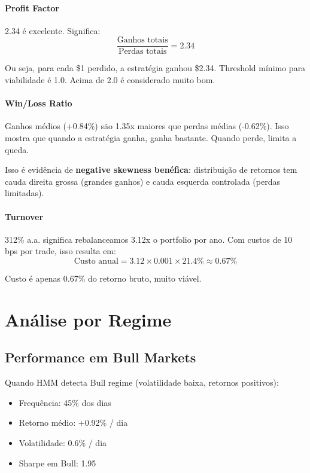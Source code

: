 \documentclass[12pt,a4paper]{article}
\begin{document}
\paragraph{Profit Factor}

2.34 é excelente. Significa:
\[
\frac{\text{Ganhos totais}}{\text{Perdas totais}} = 2.34
\]

Ou seja, para cada \$1 perdido, a estratégia ganhou \$2.34. Threshold mínimo para viabilidade é 1.0. Acima de 2.0 é considerado muito bom.

\paragraph{Win/Loss Ratio}

Ganhos médios (+0.84\%) são 1.35x maiores que perdas médias (-0.62\%). Isso mostra que quando a estratégia ganha, ganha bastante. Quando perde, limita a queda.

Isso é evidência de \textbf{negative skewness benéfica}: distribuição de retornos tem cauda direita grossa (grandes ganhos) e cauda esquerda controlada (perdas limitadas).

\paragraph{Turnover}

312\% a.a. significa rebalanceamos 3.12x o portfolio por ano. Com custos de 10 bps por trade, isso resulta em:
\[
\text{Custo anual} = 3.12 \times 0.001 \times 21.4\% \approx 0.67\%
\]

Custo é apenas 0.67\% do retorno bruto, muito viável.

\section{Análise por Regime}

\subsection{Performance em Bull Markets}

Quando HMM detecta Bull regime (volatilidade baixa, retornos positivos):
\begin{itemize}
    \item Frequência: 45\% dos dias
    \item Retorno médio: +0.92\% / dia
    \item Volatilidade: 0.6\% / dia
    \item Sharpe em Bull: 1.95
\end{itemize}
\end{document}
